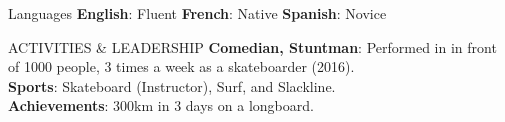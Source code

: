 \documentclass{resume}
\begin{document}
\begin{multicols}{2}
	\begin{rSection}{\Large Languages}
		\textbf{English}:  Fluent \hspace{1ex} \textbf{French}: Native \hspace{1ex} \textbf{Spanish}:  Novice
	\end{rSection}

	\begin{rSection}{\Large ACTIVITIES \& LEADERSHIP}
		\textbf{Comedian, Stuntman}: Performed in  in front of 1000 people, 3 times a week as a skateboarder (2016).\\
		\textbf{Sports}: Skateboard (Instructor), Surf, and Slackline.\\
		\textbf{Achievements}: 300km in 3 days on a longboard.
	\end{rSection}
	
	\end{multicols}
\end{document}
